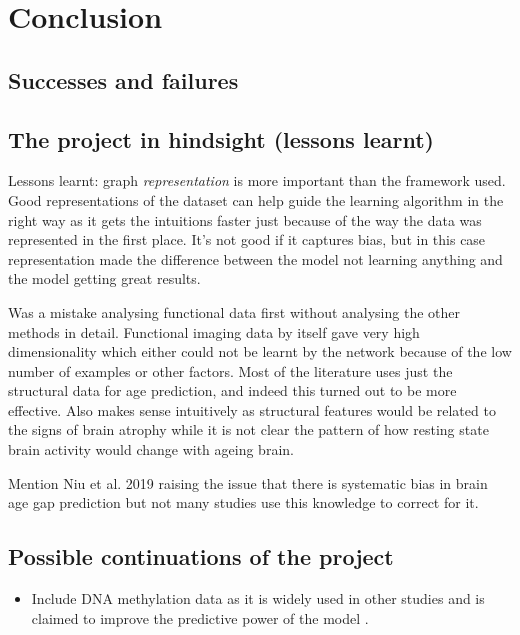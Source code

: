 \chapter{Conclusion}



\section{Successes and failures}

\section{The project in hindsight (lessons learnt)}
Lessons learnt: graph \textit{representation} is more important than the framework used. Good representations of the dataset can help guide the learning algorithm in the right way as it gets the intuitions faster just because of the way the data was represented in the first place. It's not good if it captures bias, but in this case representation made the difference between the model not learning anything and the model getting great results.

Was a mistake analysing functional data first without analysing the other methods in detail. Functional imaging data by itself gave very high dimensionality which either could not be learnt by the network because of the low number of examples or other factors. Most of the literature uses just the structural data for age prediction, and indeed this turned out to be more effective. Also makes sense intuitively as structural features would be related to the signs of brain atrophy while it is not clear the pattern of how resting state brain activity would change with ageing brain.

Mention Niu et al. 2019 raising the issue that there is systematic bias in brain age gap prediction but not many studies use this knowledge to correct for it. 


\section{Possible continuations of the project}
\begin{itemize}
    \item Include DNA methylation data as it is widely used in other studies and is claimed to improve the predictive power of the model \cite{cole2018brain}.
\end{itemize}


